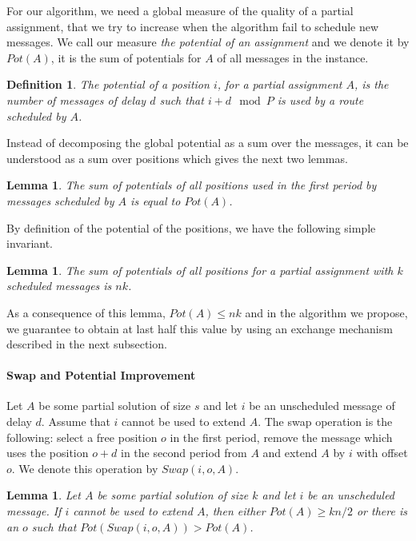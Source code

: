 \documentclass[10pt, conference, letterpaper]{IEEEtran}
\newtheorem{lemma}[theorem]{Lemma}
\newtheorem{definition}{Definition}
\begin{document}
For our algorithm, we need a global measure of the quality of a partial assignment, 
that we try to increase when the algorithm fail to schedule new messages. 
We call our measure \emph{the potential of an assignment} and we denote it by $Pot(A)$, it is the sum of potentials for $A$ of all messages in the instance.


\begin{definition}
The potential of a position $i$, for a partial assignment $A$, is the number of messages of delay $d$ such that $i+d \mod P$ is used by a route scheduled by $A$. 
\end{definition}

Instead of decomposing the global potential as a sum over the messages, it can be understood
as a sum over positions which gives the next two lemmas.

\begin{lemma}\label{lemma:pot_pos}
The sum of potentials of all positions used in the first period by messages scheduled by $A$ is equal to $Pot(A)$.  
\end{lemma}

By definition of the potential of the positions, we have the following simple invariant.

\begin{lemma}\label{lemma:inv}
The sum of potentials of all positions for a partial assignment with $k$ scheduled messages is $nk$.  
\end{lemma}

 As a consequence of this lemma, $Pot(A) \leq nk$ and in the algorithm we 
 propose, we guarantee to obtain at last half this value by using an exchange mechanism described in the next subsection.

\paragraph{Swap and Potential Improvement}


Let $A$ be some partial solution of size $s$ and let $i$ be an unscheduled message of delay $d$. 
Assume that $i$ cannot be used to extend $A$. The swap operation is the following: 
select a free position $o$ in the first period, remove the message which uses the position $o+d$ in the second period from $A$ and extend $A$ by $i$ with offset $o$. We denote this operation by $Swap(i,o,A)$.

\begin{lemma}\label{lemma:swap}
Let $A$ be some partial solution of size $k$ and let $i$ be an unscheduled message. If $i$ cannot be used to extend $A$, then either $Pot(A) \geq kn/2$ or there is an $o$ such that $Pot(Swap(i,o,A)) > Pot(A)$.
\end{lemma}
\end{document}
